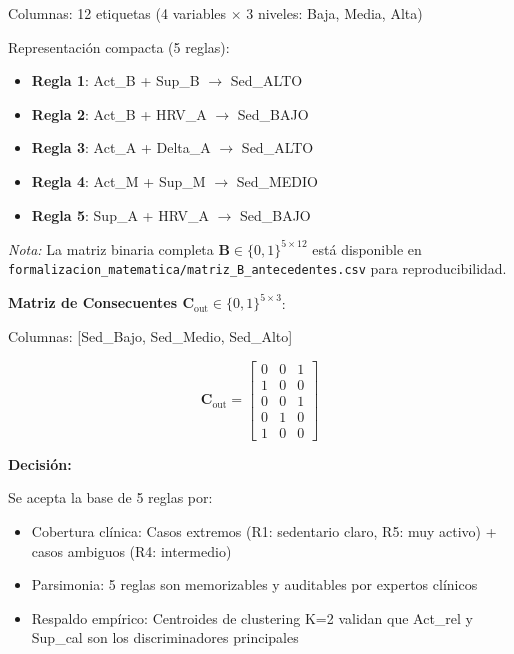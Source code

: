 \documentclass[12pt,letterpaper,twoside]{report}
\newcommand{\mat}[1]{\mathbf{#1}}
\begin{document}
\begin{calculobox}
\begin{calculobox}
Columnas: 12 etiquetas (4 variables $\times$ 3 niveles: Baja, Media, Alta)

Representación compacta (5 reglas):
\begin{itemize}[noitemsep]
    \item \textbf{Regla 1}: Act\_B + Sup\_B $\to$ Sed\_ALTO
    \item \textbf{Regla 2}: Act\_B + HRV\_A $\to$ Sed\_BAJO
    \item \textbf{Regla 3}: Act\_A + Delta\_A $\to$ Sed\_ALTO
    \item \textbf{Regla 4}: Act\_M + Sup\_M $\to$ Sed\_MEDIO
    \item \textbf{Regla 5}: Sup\_A + HRV\_A $\to$ Sed\_BAJO
\end{itemize}

\textit{Nota:} La matriz binaria completa $\mat{B} \in \{0,1\}^{5 \times 12}$ está disponible en \texttt{formalizacion\_matematica/matriz\_B\_antecedentes.csv} para reproducibilidad.

\textbf{Matriz de Consecuentes $\mat{C}_{\text{out}} \in \{0,1\}^{5 \times 3}$}:

Columnas: [Sed\_Bajo, Sed\_Medio, Sed\_Alto]

\begin{equation*}
\mat{C}_{\text{out}} = 
\begin{bmatrix}
0 & 0 & 1 \\
1 & 0 & 0 \\
0 & 0 & 1 \\
0 & 1 & 0 \\
1 & 0 & 0
\end{bmatrix}
\end{equation*}
\end{calculobox}

\begin{decisionbox}
\textbf{Decisión:}

Se acepta la base de 5 reglas por:
\begin{itemize}[noitemsep]
    \item Cobertura clínica: Casos extremos (R1: sedentario claro, R5: muy activo) + casos ambiguos (R4: intermedio)
    \item Parsimonia: 5 reglas son memorizables y auditables por expertos clínicos
    \item Respaldo empírico: Centroides de clustering K=2 validan que Act\_rel y Sup\_cal son los discriminadores principales
\end{itemize}
\end{decisionbox}


\end{calculobox}
\end{document}
